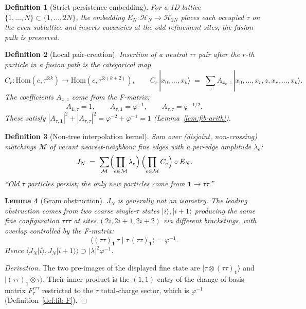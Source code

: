 \documentclass[11pt,a4paper]{article}
\newtheorem{definition}{Definition}[section]
\newtheorem{lemma}[definition]{Lemma}
\theoremstyle{definition}
\newcommand{\Hh}{\mathcal{H}}
\newcommand{\Hom}{\mathrm{Hom}}
\newcommand{\one}{\mathbf{1}}
\begin{document}
\begin{definition}[Strict persistence embedding]\label{def:persist}
For a 1D lattice $\{1,\dots,N\}\subset\{1,\dots,2N\}$, the embedding
$E_N:\Hh_N\to\Hh_{2N}$ places each occupied $\tau$ on the even sublattice
and inserts vacancies at the odd refinement sites; the fusion path is
preserved.
\end{definition}

\begin{definition}[Local pair-creation]\label{def:pair-create}
Insertion of a neutral $\tau\tau$ pair after the $r$-th particle in a fusion
path is the categorical map
\[
C_r:\Hom(c,\tau^{\otimes k})\to\Hom(c,\tau^{\otimes(k+2)}),
\qquad
C_r\,|x_0,\dots,x_k\rangle \;=\; \sum_z A_{x_r,z}\,|x_0,\dots,x_r,z,x_r,\dots,x_k\rangle.
\]
The coefficients $A_{x,z}$ come from the F-matrix:
\[
A_{\one,\tau} = 1, \qquad A_{\tau,\one} = \varphi^{-1}, \qquad A_{\tau,\tau} = \varphi^{-1/2}.
\]
These satisfy $|A_{\tau,\one}|^{2}+|A_{\tau,\tau}|^{2}
= \varphi^{-2}+\varphi^{-1} = 1$ (Lemma~\ref{lem:fib-arith}).
\end{definition}

\begin{definition}[Non-tree interpolation kernel]\label{def:Jinterp}
Sum over (disjoint, non-crossing) matchings $\mathcal{M}$ of vacant
nearest-neighbour fine edges with a per-edge amplitude $\lambda_e$:
\[
J_N \;=\; \sum_{\mathcal{M}}\Bigl(\prod_{e\in\mathcal{M}}\lambda_e\Bigr)\,
              \Bigl(\prod_{e\in\mathcal{M}}C_e\Bigr)\circ E_N.
\]
``Old $\tau$ particles persist; the only new particles come from
$\one\to\tau\tau$.''
\end{definition}

\begin{lemma}[Gram obstruction]\label{lem:Gram}
$J_N$ is generally \emph{not} an isometry. The leading obstruction comes
from two coarse single-$\tau$ states $|i\rangle,|i+1\rangle$ producing the
same fine configuration $\tau\tau\tau$ at sites $(2i,2i+1,2i+2)$ via
different bracketings, with overlap controlled by the F-matrix:
\[
\langle (\tau\tau)_\one\,\tau \mid \tau\,(\tau\tau)_\one\rangle = \varphi^{-1}.
\]
Hence $\langle J_N|i\rangle, J_N|i+1\rangle\rangle \supset |\lambda|^{2}\varphi^{-1}$.
\end{lemma}

\begin{proof}[Derivation]
The two pre-images of the displayed fine state are
$|\tau\otimes(\tau\tau)_\one\rangle$ and $|(\tau\tau)_\one\otimes\tau\rangle$.
Their inner product is the $(1,1)$ entry of the change-of-basis matrix
$F^{\tau\tau\tau}_\tau$ restricted to the $\tau$ total-charge sector,
which is $\varphi^{-1}$ (Definition~\ref{def:fib-F}).
\end{proof}
\end{document}
